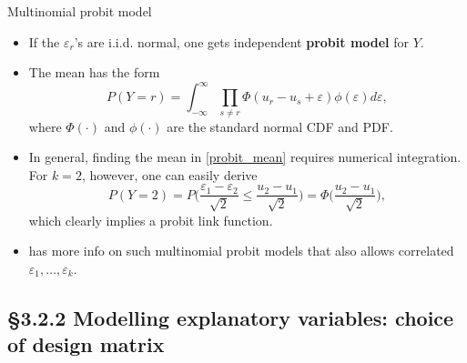 \documentclass{beamer}
\newcommand{\currentsubsection}{}
\let\oldsubsection\subsection
\renewcommand{\subsection}[1]{\oldsubsection{#1}\renewcommand{\currentsubsection}{#1}}
\newenvironment{wideitemize}%
  {\begin{itemize}%
    \setlength{\parskip}{1em}}%
  {\end{itemize}}
\begin{document}
\begin{frame}{Multinomial probit model}
\begin{wideitemize}

\item
If the $\varepsilon_r$'s are i.i.d. normal, one gets independent \textbf{probit model} for $Y$.

\item The mean  has the form 
\begin{equation}\label{probit_mean}
P(Y = r) = \int_{-\infty}^{\infty} \prod_{ s\neq r} \Phi(u_r - u_s + \varepsilon) \phi(\varepsilon) d \varepsilon, 
\end{equation}
where $\Phi(\cdot)$ and $\phi(\cdot)$ are the standard normal CDF and PDF.

\item In general, finding the mean in  \eqref{probit_mean} requires numerical integration. For $k = 2$, however, one can easily derive 
\[
P(Y = 2) = P\Big(\frac{\varepsilon_1- \varepsilon_2}{\sqrt{2}}\leq \frac{u_2-u_1}{\sqrt{2}}\Big) = \Phi\Big(  \frac{u_2-u_1}{\sqrt{2}}\Big),
\]
which clearly implies a probit link function.

\item  \cite{McFadden1984} has more info on such multinomial probit models that also allows correlated $\varepsilon_1, \dots, \varepsilon_k$.


\end{wideitemize}
\end{frame}



\subsection{\S3.2.2 Modelling explanatory variables: choice of design matrix}
\end{document}
